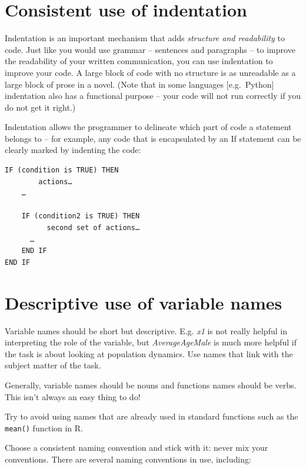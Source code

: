 \documentclass[
]{book}
\begin{document}
\hypertarget{consistent-use-of-indentation}{%
\section{Consistent use of indentation}\label{consistent-use-of-indentation}}

Indentation is an important mechanism that adds \emph{structure and readability} to code. Just like you would use grammar -- sentences and paragraphs -- to improve the readability of your written communication, you can use indentation to improve your code. A large block of code with no structure is as unreadable as a large block of prose in a novel. (Note that in some languages {[}e.g.~Python{]} indentation also has a functional purpose -- your code will not run correctly if you do not get it right.)

Indentation allows the programmer to delineate which part of code a statement belongs to -- for example, any code that is encapsulated by an If statement can be clearly marked by indenting the code:

\begin{verbatim}
IF (condition is TRUE) THEN
        actions…
    …

    IF (condition2 is TRUE) THEN
          second set of actions…
      …
    END IF
END IF
\end{verbatim}

\hypertarget{descriptive-use-of-variable-names}{%
\section{Descriptive use of variable names}\label{descriptive-use-of-variable-names}}

Variable names should be short but descriptive. E.g. \emph{x1} is not really helpful in interpreting the role of the variable, but \emph{AverageAgeMale} is much more helpful if the task is about looking at population dynamics. Use names that link with the subject matter of the task.

Generally, variable names should be nouns and functions names should be verbs. This isn't always an easy thing to do!

Try to avoid using names that are already used in standard functions such as the \texttt{mean()} function in R.

Choose a consistent naming convention and stick with it: never mix your conventions.
There are several naming conventions in use, including:
\end{document}
